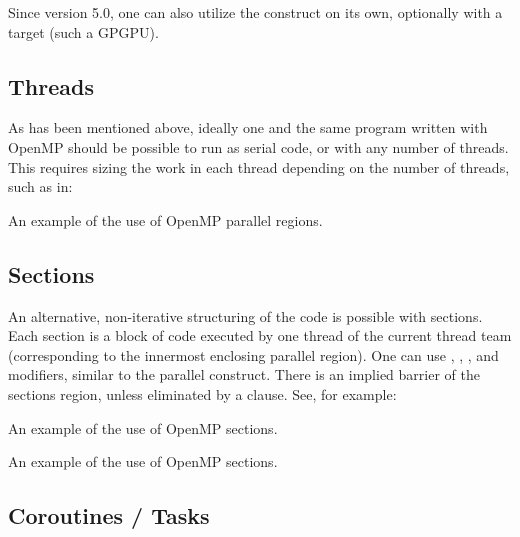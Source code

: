 Since version 5.0, one can also utilize the  construct on its own, optionally with a target (such a GPGPU). 

\subsection{Threads}

As has been mentioned above, ideally one and the same program written with OpenMP should be possible to run as serial code, or with any number of threads. 
This requires sizing the work in each thread depending on the number of threads, such as in:

\raggedbottom
\begin{codebox}[]{\href{https://godbolt.org/z/vTx9Mxzno}{\ExternalLink}}
\footnotesize An example of the use of OpenMP parallel regions.
\tcblower
{}
\end{codebox}

\subsection{Sections}

An alternative, non-iterative structuring of the code is possible with sections.
Each section is a block of code executed by one thread of the current thread team (corresponding to the innermost enclosing parallel region). 
One can use , , , and  modifiers, similar to the parallel construct. 
There is an implied barrier of the sections region, unless eliminated by a  clause.
See, for example:

\raggedbottom
\begin{codebox}[]{\href{https://godbolt.org/z/PrEPzhsGn}{\ExternalLink}}
\footnotesize An example of the use of OpenMP sections.
\tcblower
{}
\end{codebox}

\raggedbottom
\begin{codebox}[]{\href{https://godbolt.org/z/fTsv1qz4K}{\ExternalLink}}
\footnotesize An example of the use of OpenMP sections.
\tcblower
{}
\end{codebox}

\subsection{Coroutines / Tasks}

